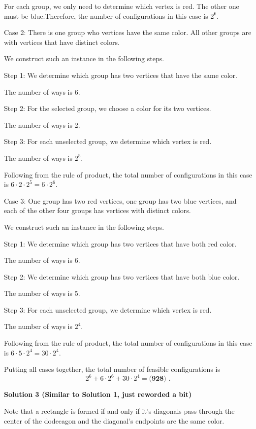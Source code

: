 \begin{enumerate}
 For each group, we only need to determine which vertex is red. The other one must be blue.Therefore, the number of configurations in this case is $2^6$.

 Case 2: There is one group who vertices have the same color. All other groups are with vertices that have distinct colors.

 We construct such an instance in the following steps.

 Step 1: We determine which group has two vertices that have the same color.

 The number of ways is 6.

 Step 2: For the selected group, we choose a color for its two vertices.

 The number of ways is 2.

 Step 3: For each unselected group, we determine which vertex is red.

 The number of ways is $2^5$.

 Following from the rule of product, the total number of configurations in this case is $6 \cdot 2 \cdot 2^5 = 6 \cdot 2^6$.

 Case 3: One group has two red vertices, one group has two blue vertices, and each of the other four groups has vertices with distinct colors.

 We construct such an instance in the following steps.

 Step 1: We determine which group has two vertices that have both red color.

 The number of ways is 6.

 Step 2: We determine which group has two vertices that have both blue color.

 The number of ways is 5.

 Step 3: For each unselected group, we determine which vertex is red.

 The number of ways is $2^4$.

 Following from the rule of product, the total number of configurations in this case is $6 \cdot 5 \cdot 2^4 = 30 \cdot 2^4$.

 Putting all cases together, the total number of feasible configurations is
 \[ 2^6 + 6 \cdot 2^6 + 30 \cdot 2^4 = \boxed{\textbf{(928) }}. \]




\textbf{Solution 3 (Similar to Solution 1, just reworded a bit)}

Note that a rectangle is formed if and only if it's diagonals pass through the center of the dodecagon and the diagonal's endpoints are the same color. 


\end{enumerate}
